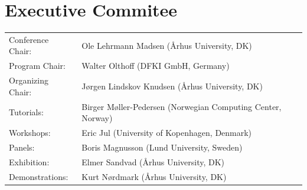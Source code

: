 \documentclass{llncs}
\begin{document}
\section*{Executive Commitee}
\begin{tabular}{@{}p{5cm}@{}p{7.2cm}@{}}
Conference Chair:&Ole Lehrmann Madsen (\AA rhus University, DK)\\
Program Chair:   &Walter Olthoff (DFKI GmbH, Germany)\\
Organizing Chair:&J\o rgen Lindskov Knudsen (\AA rhus University, DK)\\
Tutorials:&Birger M\o ller-Pedersen\hfil\break
(Norwegian Computing Center, Norway)\\
Workshops:&Eric Jul (University of Kopenhagen, Denmark)\\
Panels:&Boris Magnusson (Lund University, Sweden)\\
Exhibition:&Elmer Sandvad (\AA rhus University, DK)\\
Demonstrations:&Kurt N\o rdmark (\AA rhus University, DK)
\end{tabular}
%
\end{document}
